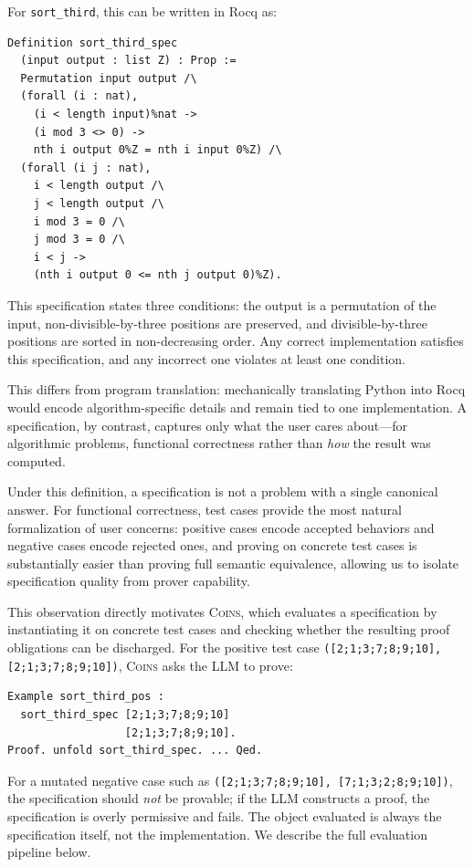 For \texttt{sort\_third}, this can be written in Rocq as:

\begin{lstlisting}[basicstyle=\ttfamily\scriptsize]
Definition sort_third_spec
  (input output : list Z) : Prop :=
  Permutation input output /\
  (forall (i : nat),
    (i < length input)%nat ->
    (i mod 3 <> 0) ->
    nth i output 0%Z = nth i input 0%Z) /\
  (forall (i j : nat),
    i < length output /\
    j < length output /\
    i mod 3 = 0 /\
    j mod 3 = 0 /\
    i < j ->
    (nth i output 0 <= nth j output 0)%Z).
\end{lstlisting}

\noindent
This specification states three conditions:
the output is a permutation of the input,
non-divisible-by-three positions are preserved,
and divisible-by-three positions are sorted in non-decreasing order.
Any correct implementation satisfies this specification,
and any incorrect one violates at least one condition.

\noindent
This differs from program translation: mechanically translating Python into
Rocq would encode algorithm-specific details and remain tied to one
implementation. A specification, by contrast, captures only what the user
cares about---for algorithmic problems, functional correctness rather than
\emph{how} the result was computed.

Under this definition, a specification is not a problem with a single
canonical answer. For functional correctness, test cases provide the most
natural formalization of user concerns: positive cases encode accepted
behaviors and negative cases encode rejected ones, and proving on concrete
test cases is substantially easier than proving full semantic equivalence,
allowing us to isolate specification quality from prover capability.

This observation directly motivates \textsc{Coins}, which evaluates a
specification by instantiating it on concrete test cases and checking
whether the resulting proof obligations can be discharged. For the positive
test case \lstinline|([2;1;3;7;8;9;10], [2;1;3;7;8;9;10])|, \textsc{Coins}
asks the LLM to prove:

\begin{lstlisting}[basicstyle=\ttfamily\scriptsize]
Example sort_third_pos :
  sort_third_spec [2;1;3;7;8;9;10]
                  [2;1;3;7;8;9;10].
Proof. unfold sort_third_spec. ... Qed.
\end{lstlisting}

\noindent
For a mutated negative case such as
\lstinline|([2;1;3;7;8;9;10], [7;1;3;2;8;9;10])|, the specification should
\emph{not} be provable; if the LLM constructs a proof, the specification is
overly permissive and fails. The object evaluated is always the
specification itself, not the implementation. We describe the full
evaluation pipeline below.
